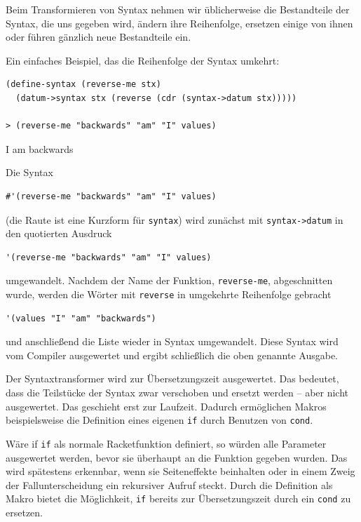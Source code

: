 Beim Transformieren von Syntax nehmen wir üblicherweise die Bestandteile der Syntax, die uns gegeben wird, ändern ihre Reihenfolge, ersetzen einige von ihnen oder führen gänzlich neue Bestandteile ein.

Ein einfaches Beispiel, das die Reihenfolge der Syntax umkehrt:

\begin{lstlisting}
(define-syntax (reverse-me stx)
  (datum->syntax stx (reverse (cdr (syntax->datum stx)))))
  
> (reverse-me "backwards" "am" "I" values)
\end{lstlisting}
{\routput {\qq}I{\qq} {\qq}am{\qq} {\qq}backwards{\qq}}

Die Syntax

\begin{lstlisting}
#'(reverse-me "backwards" "am" "I" values)
\end{lstlisting}

(die Raute ist eine Kurzform für \texttt{syntax}) wird zunächst mit \texttt{syntax->datum} in den quotierten Ausdruck 

\begin{lstlisting}
'(reverse-me "backwards" "am" "I" values)
\end{lstlisting}


umgewandelt. Nachdem der Name der Funktion, \texttt{reverse-me}, abgeschnitten wurde, werden die Wörter mit \texttt{reverse} in umgekehrte Reihenfolge gebracht

\begin{lstlisting}
'(values "I" "am" "backwards")
\end{lstlisting}

und anschließend die Liste wieder in Syntax umgewandelt. Diese Syntax wird vom Compiler ausgewertet und ergibt schließlich die oben genannte Ausgabe.


Der Syntaxtransformer wird zur Übersetzungszeit ausgewertet. Das bedeutet, dass die Teilstücke der Syntax zwar verschoben und ersetzt werden -- aber nicht ausgewertet. Das geschieht erst zur Laufzeit. Dadurch ermöglichen Makros beispielsweise die Definition eines eigenen \texttt{if} durch Benutzen von \texttt{cond}.

Wäre if \texttt{if} als normale Racketfunktion definiert, so würden alle Parameter ausgewertet werden, bevor sie überhaupt an die Funktion gegeben wurden. Das wird spätestens erkennbar, wenn sie Seiteneffekte beinhalten oder in einem Zweig der Fallunterscheidung ein rekursiver Aufruf steckt. Durch die Definition als Makro bietet die Möglichkeit, \texttt{if} bereits zur Übersetzungszeit durch ein \texttt{cond} zu ersetzen.


